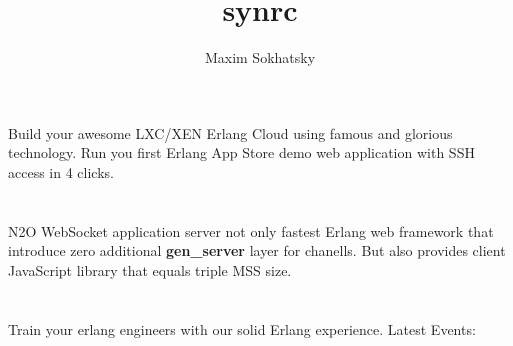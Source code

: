 \documentclass[11pt]{article}
\begin{document}
\title{synrc}
\author{Maxim Sokhatsky}
\section*{}
\paragraph{}
Build your awesome LXC/XEN Erlang Cloud using
famous  and
glorious  technology.
Run you first Erlang App Store demo web application with SSH access in 4 clicks.

\section*{}
\paragraph{}
N2O WebSocket application server not only fastest Erlang web
framework that introduce zero additional {\bf gen_server} layer for chanells.
But also provides client JavaScript library that equals triple MSS size.

\section*{}
\paragraph{}
Train your erlang engineers with our solid Erlang experience.
Latest Events:
\paragraph{}
\paragraph{}
\end{document}
